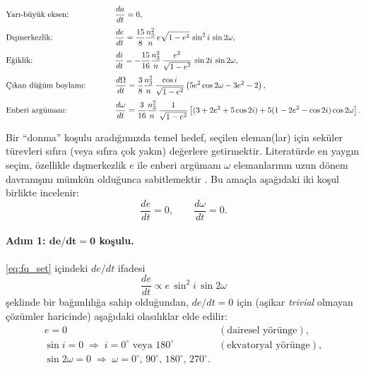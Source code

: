 \begin{equation}
\label{eq:fq_set}
\begin{aligned}
\makebox[4.8cm][l]{\text{Yarı-büyük eksen:}} &
\frac{da}{dt} = 0, \\[3pt]
\makebox[4.8cm][l]{\text{Dışmerkezlik:}} &
\frac{de}{dt} = \frac{15}{8}\frac{n_{3}^{2}}{n}\, e \sqrt{1-e^{2}} \,\sin^{2} i \,\sin 2\omega, \\[3pt]
\makebox[4.8cm][l]{\text{Eğiklik:}} &
\frac{di}{dt} = -\frac{15}{16}\frac{n_{3}^{2}}{n}\,\frac{e^{2}}{\sqrt{1-e^{2}}}\,\sin 2i\, \sin 2\omega, \\[3pt]
\makebox[4.8cm][l]{\text{Çıkan düğüm boylamı:}} &
\frac{d\Omega}{dt} = \frac{3}{8}\frac{n_{3}^{2}}{n}\,\frac{\cos i}{\sqrt{1-e^{2}}}
\left( 5e^{2}\cos 2\omega - 3e^{2} - 2 \right), \\[3pt]
\makebox[4.8cm][l]{\text{Enberi argümanı:}} &
\frac{d\omega}{dt} = \frac{3}{16}\frac{n_{3}^{2}}{n}\,\frac{1}{\sqrt{1-e^{2}}}
\left[ (3+2e^{2}+5\cos 2i) + 5(1-2e^{2}-\cos 2i)\cos 2\omega \right].
\end{aligned}
\end{equation}


Bir ``donma'' koşulu aradığımızda temel hedef, seçilen eleman(lar) için seküler türevleri sıfıra (veya sıfıra çok yakın)
değerlere getirmektir. Literatürde en yaygın seçim, özellikle dışmerkezlik $e$ ile enberi argümanı $\omega$ elemanlarının
uzun dönem davranışını mümkün olduğunca sabitlemektir \cite{Folta2006}. Bu amaçla aşağıdaki iki koşul birlikte incelenir:
\begin{equation}
\label{eq:freeze_conditions}
\frac{de}{dt}=0,
\qquad
\frac{d\omega}{dt}=0.
\end{equation}

\paragraph{Adım 1: $\boldsymbol{de/dt=0}$ koşulu.}
\eqref{eq:fq_set} içindeki $de/dt$ ifadesi
\begin{equation}
\frac{de}{dt} \propto e\,\sin^{2}i\,\sin 2\omega
\end{equation}
şeklinde bir bağımlılığa sahip olduğundan, $de/dt=0$ için (aşikar \emph{trivial} olmayan çözümler haricinde) aşağıdaki olasılıklar elde edilir:
\begin{align}
e=0 \quad &(\text{dairesel yörünge}), \label{eq:cond_e0}\\
\sin i = 0 \;\Rightarrow\; i=0^\circ \text{ veya } 180^\circ \quad &(\text{ekvatoryal yörünge}), \label{eq:cond_i0}\\
\sin 2\omega=0 \;\Rightarrow\; \omega=0^\circ,\,90^\circ,\,180^\circ,\,270^\circ. \label{eq:cond_omega}
\end{align}

